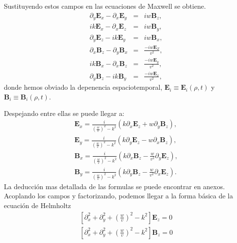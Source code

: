 Sustituyendo estos campos en las ecuaciones de Maxwell se obtiene.
\begin{subequations}\label{Camposexplicitos}
	\begin{eqnarray}
	\partial_{y}\mathbf{E}_{x}-\partial_{x}\mathbf{E}_{y} &=& i w \mathbf{B}_{z}, \\
	i k \mathbf{E}_{x}-\partial_{x}\mathbf{E}_{z} &=& i w \mathbf{B}_{y}, \\
	\partial_{y}\mathbf{E}_{z}-i k \mathbf{E}_{y} &=& i w \mathbf{B}_{x}, \\
	\partial_{x}\mathbf{B}_{z}-\partial_{y}\mathbf{B}_{x} &=& \frac{-iw \mathbf{E}_{Z} }{v^2}, \\
	i k \mathbf{B}_{x}-\partial_{x}\mathbf{B}_{z} &=& \frac{-iw \mathbf{E}_{y} }{v^2} ,\\
	\partial_{y}\mathbf{B}_{z}- i k \mathbf{B}_{y} &=& \frac{-iw \mathbf{E}_{x} }{v^2},
	\end{eqnarray}
\end{subequations}
donde hemos obviado la depenencia espaciotemporal, $\mathbf{E}_{i} \equiv \mathbf{E}_{i}(\rho,t)$ y $\mathbf{B}_{i} \equiv \mathbf{B}_{i}(\rho,t)$.

Despejando entre ellas se puede llegar a:
\begin{subequations}\label{Ecuacionesdecampo}
	\begin{align}
	\mathbf{E}_{x} = \frac{i}{(\frac{w}{v})^2 - k^2} (k \partial_{x}\mathbf{E}_{z}+w \partial_{y} \mathbf{B}_{z}), \\
	\mathbf{E}_{y} = \frac{i}{(\frac{w}{v})^2 - k^2} (k \partial_{y}\mathbf{E}_{z}-w \partial_{x} \mathbf{B}_{z}), \\
	\mathbf{B}_{x} = \frac{i}{(\frac{w}{v})^2 - k^2} (k \partial_{x}\mathbf{B}_{z}- \frac{w}{v^2} \partial_{y} \mathbf{E}_{z}), \\
	\mathbf{B}_{y} = \frac{i}{(\frac{w}{v})^2 - k^2} (k \partial_{y}\mathbf{B}_{z}- \frac{w}{v^2} \partial_{x} \mathbf{E}_{z}). 
	\end{align}
\end{subequations}
La deducción mas detallada de las formulas se puede encontrar en anexos. Acoplando los campos y factorizando, podemos llegar a la forma básica de la ecuación de Helmholtz 
\begin{subequations}\label{Helmholtz}
	\begin{align}
	[\partial_{x}^2+\partial_{y}^2+(\frac{w}{v})^2-k^2] \mathbf{E}_{z}=0\\
	[\partial_{x}^2+\partial_{y}^2+(\frac{w}{v})^2-k^2] \mathbf{B}_{z}=0
	\end{align}
\end{subequations}
